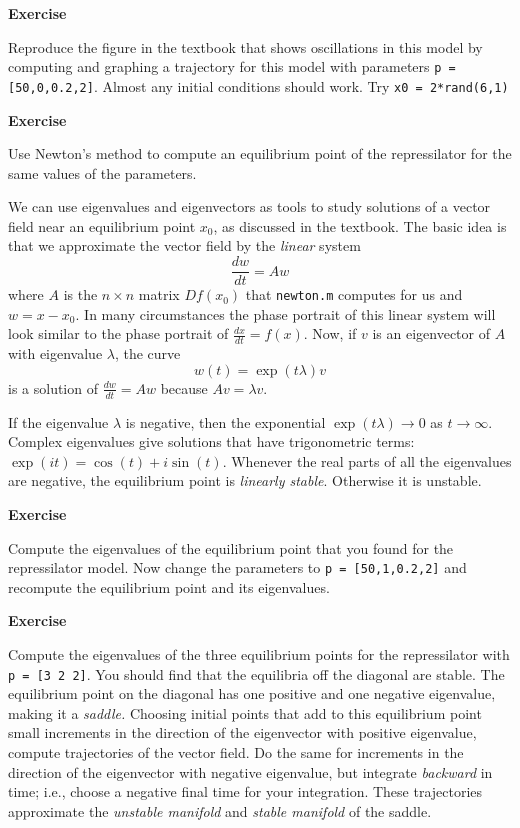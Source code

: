 \documentclass [11pt]{article}
\newcounter{exercise}
\numberwithin{exercise}{section}
\newcommand{\exnumber}{\addtocounter{exercise}{1} \theexercise \thinspace}
\begin{document}
{\bf Exercise \exnumber} Reproduce the figure in the textbook that shows 
oscillations in this model by computing and graphing a trajectory 
for this model with parameters \texttt{p = [50,0,0.2,2]}. Almost any 
initial conditions should work. Try \texttt{x0 = 2*rand(6,1)}

{\bf Exercise \exnumber} Use Newton's method to compute an equilibrium point of the 
repressilator for the same values of the parameters.

We can use eigenvalues and eigenvectors as tools to study solutions of a
vector field near an equilibrium point $x_0$, as discussed in the textbook. 
The basic idea is that we approximate the vector field by the {\it linear}
system 
$$ \frac{dw}{dt} = Aw$$
where $A$ is the $n \times n$ matrix $Df(x_0)$ that \texttt{newton.m} computes
for us and $w = x-x_0$. In many circumstances the phase portrait of this linear 
system will look similar to the phase portrait of $\frac{dx}{dt} = f(x)$. 
Now, if $v$ is an eigenvector of $A$ with eigenvalue $\lambda$, the curve
$$w(t) = \exp(t\lambda)v$$ is a solution of $ \frac{dw}{dt} = Aw$ because
$Av = \lambda v$.

If the eigenvalue $\lambda$ is  negative, then the exponential $\exp(t\lambda) \to 0$
as $t \to \infty$. Complex eigenvalues give solutions that have trigonometric
terms:  $\exp(it) = \cos(t) + i \sin(t)$. Whenever the real parts of all the eigenvalues
are negative, the equilibrium point is {\it linearly stable}. Otherwise it is
unstable.

{\bf Exercise \exnumber} Compute the eigenvalues of the equilibrium point that you found 
for the repressilator model. Now change the parameters to \texttt{p = [50,1,0.2,2]} and recompute the
equilibrium point and its eigenvalues.

{\bf Exercise \exnumber} Compute the eigenvalues of the three equilibrium
points for the repressilator with \texttt{p = [3 2 2]}. You should
find that the equilibria off the diagonal are stable. The equilibrium
point on the diagonal has one positive and one negative eigenvalue,
making it a {\it saddle.} Choosing initial points that add to this
equilibrium point small increments in the direction of the eigenvector
with positive eigenvalue, compute trajectories of the vector field.
Do the same for increments in the direction of the eigenvector with
negative eigenvalue, but integrate {\it backward} in time; i.e.,
choose a negative final time for your integration. These trajectories
approximate the {\it unstable manifold} and {\it stable manifold} of
the saddle.
\end{document}
